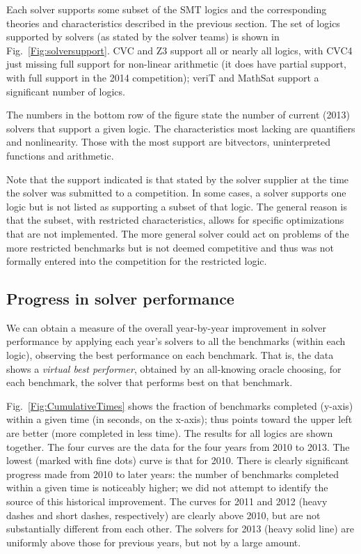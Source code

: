 \documentclass[smallcondensed]{svjour3}
\begin{document}
Each solver supports some subset of the SMT logics and the corresponding theories and characteristics described in the previous section. The set of logics supported by solvers (as stated by the solver teams) is shown in Fig.~\ref{Fig:solversupport}. CVC and Z3 support all or nearly all logics, with CVC4 just missing full support for non-linear arithmetic (it does have partial support, with full support in the 2014 competition); veriT and MathSat support a significant number of logics.

The numbers in the bottom row of the figure state the number of current (2013) solvers that support a given logic. The characteristics most lacking are quantifiers and nonlinearity. Those with the most support are bitvectors, uninterpreted functions and arithmetic.

Note that the support indicated is that stated by the solver supplier at the time the solver was submitted to a competition. 
In some cases, a solver supports one logic but is not listed as supporting a subset of that logic. The general reason is that the subset, with restricted characteristics, allows for specific optimizations that are not implemented. The more general solver could act on problems of the
more restricted benchmarks but is not deemed competitive and thus was not formally entered into the competition for the restricted logic.


\subsection{Progress in solver performance}
\label{Progress}

We can obtain a measure of the overall year-by-year improvement in solver performance by applying each year's solvers to all the benchmarks (within each logic), observing the best performance on each benchmark. That is, the data shows a {\em virtual best performer}, obtained by an all-knowing oracle choosing, for each benchmark, the solver that performs best on that benchmark.

Fig.~\ref{Fig:CumulativeTimes} shows the fraction of benchmarks completed (y-axis) within a given time (in seconds, on the x-axis); thus points toward the upper left are better (more completed in less time). The results for all logics are shown together. 
The four curves are the data for the four years from 2010 to 2013. The lowest (marked with fine dots) curve is that for 2010. 
There is clearly significant progress made from 2010 to later years: the number of benchmarks completed within a given time is noticeably higher; we did not attempt to identify the source of this historical improvement. The curves for 2011 and 2012 (heavy dashes and short dashes, respectively) are clearly above 2010, but are not substantially different from each other. The solvers for 2013 (heavy solid line) are uniformly above those for previous years, but not by a large amount.  
\end{document}
